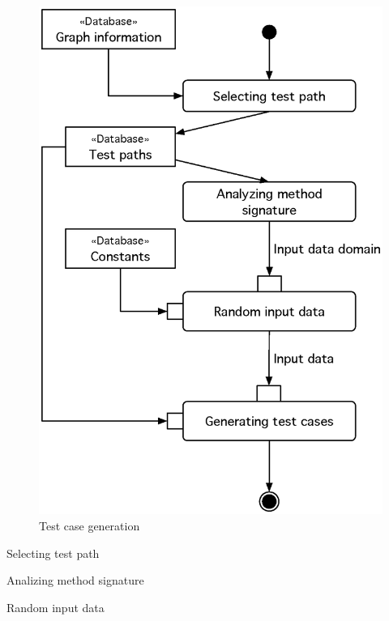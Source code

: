 \documentclass{beamer}
\begin{document}
\begin{frame}
    \begin{figure}
        \includegraphics[height=.8\paperheight]{figure/Activities}
        \caption{Test case generation}
        \label{fig:testcasegenearation}
    \end{figure}
\end{frame}

\begin{frame}{Selecting test path}
\end{frame}

\begin{frame}{Analizing method signature}
\end{frame}

\begin{frame}{Random input data}
\end{frame}
\end{document}
